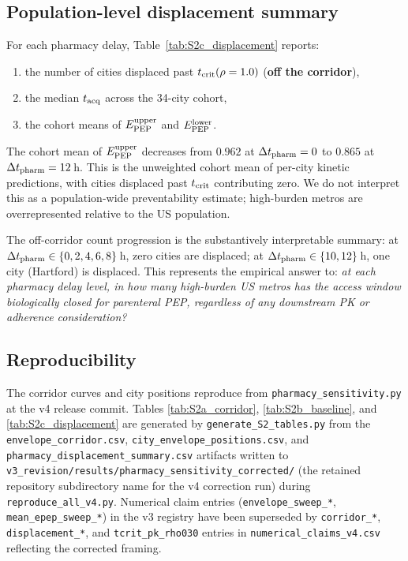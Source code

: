 \documentclass[11pt]{article}
\theoremstyle{definition}
\theoremstyle{remark}
\begin{document}
\subsection{Population-level displacement summary}
\label{sec:S2_summary}

For each pharmacy delay, Table~\ref{tab:S2c_displacement} reports:
\begin{enumerate}
  \item the number of cities displaced past $t_{\rm crit}(\rho=1.0)$
        (\textbf{off the corridor}),
  \item the median $t_{\rm acq}$ across the 34-city cohort,
  \item the cohort means of $E_{\rm PEP}^{\rm upper}$ and
        $E_{\rm PEP}^{\rm lower}$.
\end{enumerate}
The cohort mean of $E_{\rm PEP}^{\rm upper}$ decreases from $0.962$ at
$\Delta t_{\rm pharm} = 0$ to $0.865$ at $\Delta t_{\rm pharm} = 12$\,h.
This is the unweighted cohort mean of per-city kinetic predictions, with
cities displaced past $t_{\rm crit}$ contributing zero.  We do not
interpret this as a population-wide preventability estimate;
high-burden metros are overrepresented relative to the US population.

The off-corridor count progression is the substantively interpretable
summary: at $\Delta t_{\rm pharm} \in \{0, 2, 4, 6, 8\}$\,h, zero cities
are displaced; at $\Delta t_{\rm pharm} \in \{10, 12\}$\,h, one city
(Hartford) is displaced.  This represents the empirical answer to:
\emph{at each pharmacy delay level, in how many high-burden US metros
has the access window biologically closed for parenteral PEP, regardless
of any downstream PK or adherence consideration?}



\subsection{Reproducibility}
\label{sec:S2_reproducibility}

The corridor curves and city positions reproduce from
\texttt{pharmacy\_sensitivity.py} at the v4 release commit.  Tables
\ref{tab:S2a_corridor}, \ref{tab:S2b_baseline}, and
\ref{tab:S2c_displacement} are generated by
\texttt{generate\_S2\_tables.py} from the
\texttt{envelope\_corridor.csv}, \texttt{city\_envelope\_positions.csv},
and \texttt{pharmacy\_displacement\_summary.csv} artifacts written to
\texttt{v3\_revision/results/pharmacy\_sensitivity\_corrected/}
(the retained repository subdirectory name for the v4 correction run)
during \texttt{reproduce\_all\_v4.py}.  Numerical claim entries
(\texttt{envelope\_sweep\_*}, \texttt{mean\_epep\_sweep\_*}) in the
v3 registry have been superseded by \texttt{corridor\_*},
\texttt{displacement\_*}, and \texttt{tcrit\_pk\_rho030} entries in
\texttt{numerical\_claims\_v4.csv} reflecting the corrected framing.


\end{document}
